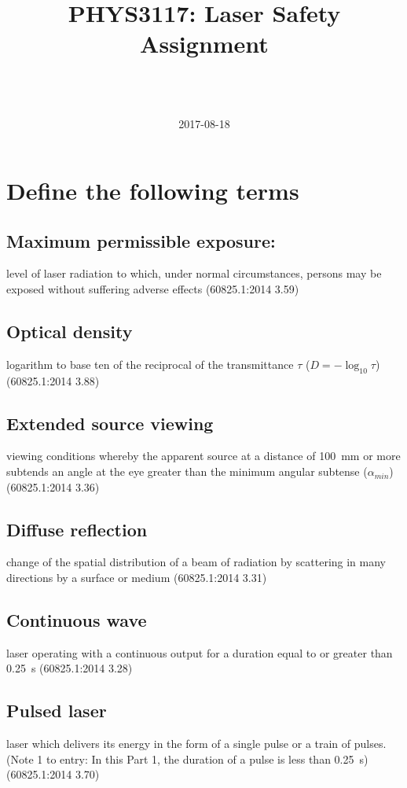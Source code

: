 \documentclass[a4paper]{scrartcl}
\begin{document}
\title{PHYS3117: Laser Safety Assignment}
\author{ \\ \\ }
\date{2017-08-18}
\maketitle

\section{Define the following terms}
\subsection{Maximum permissible exposure:}
level of laser radiation to which, under normal circumstances, persons may be exposed without suffering adverse effects (60825.1:2014 3.59)

\subsection{Optical density}
logarithm to base ten of the reciprocal of the transmittance \(\tau\) (\(D = -\log_{10} \tau\)) (60825.1:2014 3.88)

\subsection{Extended source viewing}
viewing conditions whereby the apparent source at a distance of \SI{100}{\milli\metre} or more subtends an angle at the eye greater than the minimum angular subtense (\(\alpha_{min}\)) (60825.1:2014 3.36)

\subsection{Diffuse reflection}
change of the spatial distribution of a beam of radiation by scattering in many directions by a surface or medium (60825.1:2014 3.31)

\subsection{Continuous wave}
laser operating with a continuous output for a duration equal to or greater than \SI{0.25}{\second} (60825.1:2014 3.28)

\subsection{Pulsed laser}
laser which delivers its energy in the form of a single pulse or a train of pulses. (Note 1 to entry: In this Part 1, the duration of a pulse is less than \SI{0.25}{\second}) (60825.1:2014 3.70)
\end{document}

